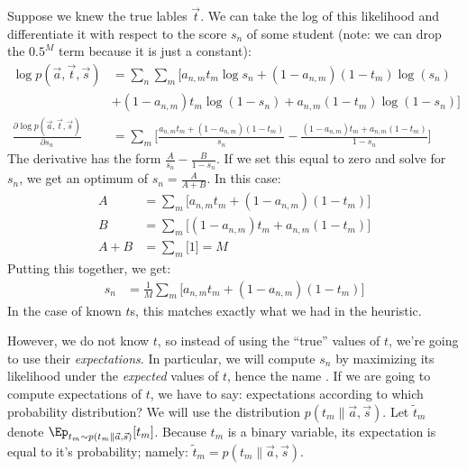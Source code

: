 Suppose we knew the true lables $\vec t$. We can take the log of this likelihood and differentiate it with respect to the score $s_n$ of some student (note: we can drop the $0.5^M$ term because it is just a constant):
~
\begin{align}
\log p(\vec a, \vec t, \vec s)
&= \sum_n \sum_m \Big[
     a_{n,m}t_m \log s_n
 +   (1-a_{n,m})(1-t_m) \log (s_n) \nonumber \\
&+   (1-a_{n,m})t_m \log (1-s_n)
 +   a_{n,m}(1-t_m) \log (1-s_n) \Big]\\
\frac {\partial \log p(\vec a, \vec t, \vec s)} {\partial s_n}
&= \sum_m \Big[
     \frac {a_{n,m} t_m + (1-a_{n,m}) (1-t_m)} {s_n}
   - \frac {(1-a_{n,m}) t_m + a_{n,m} (1-t_m)} {1-s_n} \Big]
\end{align}
%
The derivative has the form $\frac A {s_n} - \frac B {1-s_n}$. If we set this equal to zero and
solve for $s_n$, we get an optimum of $s_n = \frac A {A+B}$. In this case:
%
\begin{align}
  A &= \sum_m \big[ a_{n,m} t_m + (1-a_{n,m}) (1-t_m) \big]\\
  B &= \sum_m \big[ (1-a_{n,m}) t_m + a_{n,m} (1-t_m) \big]\\
A+B &= \sum_m \big[ 1 \big] = M
\end{align}
%
Putting this together, we get:
%
\begin{align}
  s_n &= \frac 1 M \sum_m \big[ a_{n,m} t_m + (1-a_{n,m}) (1-t_m) \big]
\end{align}
%
In the case of known $t$s, this matches exactly what we had in the heuristic.

However, we do not know $t$, so instead of using the ``true'' values of $t$, we're going to use their \emph{expectations}.
In particular, we will compute $s_n$ by maximizing its likelihood under the \emph{expected} values of $t$, hence the name .
%
If we are going to compute expectations of $t$, we have to say: expectations according to which probability distribution?
We will use the distribution $p(t_m \| \vec a, \vec s)$.
Let $\tilde t_m$ denote $\Ep_{t_m \sim p(t_m \| \vec a, \vec s)}[t_m]$.
Because $t_m$ is a binary variable, its expectation is equal to it's probability;
namely: $\tilde t_m = p(t_m \| \vec a, \vec s)$.

